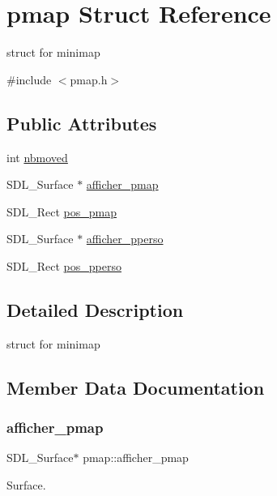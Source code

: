 \hypertarget{structpmap}{}\section{pmap Struct Reference}
\label{structpmap}


struct for minimap  




{\ttfamily \#include $<$pmap.\+h$>$}

\subsection*{Public Attributes}
\begin{DoxyCompactItemize}
\item 
int \hyperlink{structpmap_a70b813baa5dd1ba32e676491019f344c}{nbmoved}
\item 
S\+D\+L\+\_\+\+Surface $\ast$ \hyperlink{structpmap_a4fd1750570590001528322da168bbf8e}{afficher\+\_\+pmap}
\item 
S\+D\+L\+\_\+\+Rect \hyperlink{structpmap_a1ec871d94c7648f3f1dc49e9cd3146d5}{pos\+\_\+pmap}
\item 
S\+D\+L\+\_\+\+Surface $\ast$ \hyperlink{structpmap_a8c940484d97587e6c202433f7c2d5673}{afficher\+\_\+pperso}
\item 
S\+D\+L\+\_\+\+Rect \hyperlink{structpmap_a6534b3c60d544631809c86d76450b592}{pos\+\_\+pperso}
\end{DoxyCompactItemize}


\subsection{Detailed Description}
struct for minimap 

\subsection{Member Data Documentation}
\mbox{\label{structpmap_a4fd1750570590001528322da168bbf8e}} 
\subsubsection{\texorpdfstring{afficher\+\_\+pmap}{afficher\_pmap}}
{\footnotesize\ttfamily S\+D\+L\+\_\+\+Surface$\ast$ pmap\+::afficher\+\_\+pmap}

Surface. \mbox{\label{structpmap_a8c940484d97587e6c202433f7c2d5673}} 
